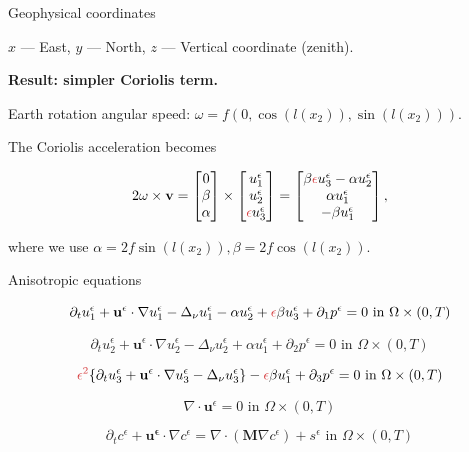 \documentclass{beamer}
\begin{document}
\begin{frame}{Geophysical coordinates}

$x$ --- East, $y$ --- North, $z$ --- Vertical coordinate (zenith).

\textbf{Result: simpler Coriolis term.}

Earth rotation angular speed: $\omega = f (0, \cos(l(x_2)), \sin(l(x_2))).$ 

The Coriolis acceleration becomes

\begin{gather} \nonumber
2 \omega \times \mathbf{v}
=
\begin{bmatrix} 0 \\ \beta \\ \alpha \end{bmatrix}
 \times
 \begin{bmatrix} u^\epsilon_1 \\ u^\epsilon_2 \\ \textcolor{jasper}{\epsilon} u^\epsilon_3 \end{bmatrix}
 =
 \begin{bmatrix}  \beta \textcolor{jasper}{\epsilon} u^\epsilon_3 - \alpha u^\epsilon_2 \\ \alpha u^\epsilon_1  \\ - \beta u^\epsilon_1 \end{bmatrix},
\end{gather}

where we use $\alpha = 2f \sin(l(x_2)), \beta = 2f \cos(l(x_2)).$

\end{frame}

\begin{frame}{Anisotropic equations}

$$ \partial_t u^\epsilon _1 + \mathbf{u}^\epsilon \cdot \nabla u^\epsilon _1 -\Delta_\nu u^\epsilon _1 -\alpha u_2^\epsilon + \textcolor{jasper}{\epsilon} \beta u_3^\epsilon + \partial_1 p^\epsilon = 0 \text{ in } \Omega \times (0,T) $$

$$ \partial_t u_2^\epsilon + \mathbf{u}^\epsilon \cdot \nabla u_2^\epsilon -\Delta_\nu u_2^\epsilon + \alpha u_1^\epsilon + \partial_2 p^\epsilon = 0 \text{ in } \Omega \times (0,T) $$

$$ \textcolor{jasper}{\epsilon^2} \{  \partial_t u_3^\epsilon + \mathbf{u}^\epsilon \cdot \nabla u_3^\epsilon -\Delta_\nu u_3^{\epsilon} \} - \textcolor{jasper}{\epsilon} \beta u_1^\epsilon + \partial_3 p^\epsilon = 0 \text{ in } \Omega \times (0,T) $$

$$ \nabla \cdot \mathbf{u}^\epsilon= 0 \text{ in } \Omega \times (0,T) $$

$$ \partial_t c^\epsilon + \mathbf{u^\epsilon} \cdot \nabla c^\epsilon = \nabla \cdot (\mathbf{M} \nabla c^\epsilon) + s^\epsilon \text{ in } \Omega \times (0,T) $$

\end{frame}
\end{document}
